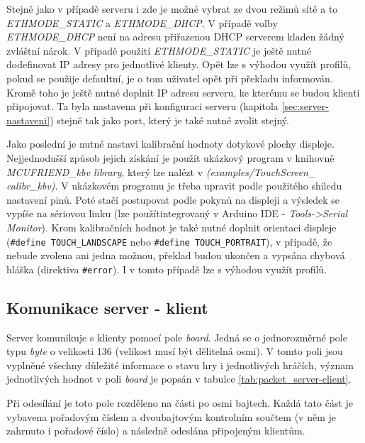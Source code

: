 Stejně jako v případě serveru i zde je možné vybrat ze dvou režimů sítě a to \textit{ETHMODE\_STATIC} a \textit{ETHMODE\_DHCP}. V případě volby \textit{ETHMODE\_DHCP} není na adresu přiřazenou DHCP serverem kladen žádný zvláštní nárok. V případě použití \textit{ETHMODE\_STATIC} je ještě nutné dodefinovat IP adresy pro jednotlivé klienty. Opět lze s výhodou využít profilů, pokud se použije defaultní, je o tom uživatel opět při překladu informován.
Kromě toho je ještě nutné doplnit IP adresu serveru, ke kterému se budou klienti připojovat. Ta byla nastavena při konfiguraci serveru (kapitola \ref{sec:server-nastaveni}) stejně tak jako port, který je také nutné zvolit stejný.


Jako poslední je nutné nastavi kalibrační hodnoty dotykové plochy displeje. Nejjednodušší způsob jejich získání je použít ukázkový program v knihovně \textit{MCUFRIEND\_kbv library}, který lze nalézt  v \textit{(examples/TouchScreen\_
calibr\_kbv)}. V ukázkovém programu je třeba upravit podle použitého shiledu nastavení pinů. Poté stačí postupovat podle pokynů na displeji a výsledek se vypíše na sériovou linku (lze použítintegrovaný v Arduino IDE - \textit{Tools->Serial Monitor}). Krom kalibračních hodnot je také nutné doplnit orientaci displeje (\texttt{\#define TOUCH\_LANDSCAPE} nebo \texttt{\#define TOUCH\_PORTRAIT}), v případě, že nebude zvolena ani jedna možnou, překlad budou ukončen a vypsána chybová hláška (direktiva \texttt{\#error}). I v tomto případě lze s výhodou využít profilů.


\subsection{Komunikace server - klient}
\label{sec:comm_server-client}
Server komunikuje s klienty pomocí pole \textit{board}. Jedná se o jednorozměrné pole typu \textit{byte} o velikosti 136 (velikost musí být dělitelná osmi). V tomto poli jsou vyplněné všechny důležité informace o stavu hry i jednotlivých hráčích, význam jednotlivých hodnot v poli \textit{board} je popsán v tabulce \ref{tab:packet_server-client}.

Při odesílání je toto pole rozděleno na části po osmi bajtech. Každá tato část je vybavena pořadovým číslem a dvoubajtovým kontrolním součtem (v něm je zahrnuto i pořadové číslo) a následně odeslána připojeným klientům.

